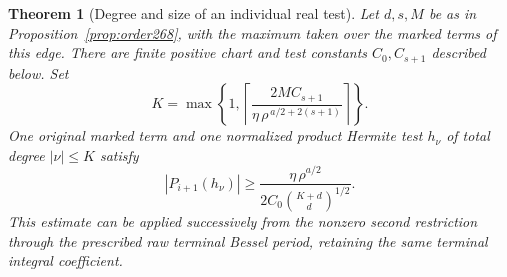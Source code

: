 \documentclass[a4paper,11pt]{article}
\newtheorem{theorem}[proposition]{Theorem}
\theoremstyle{definition}
\theoremstyle{remark}
\numberwithin{equation}{section}
\begin{document}
\begin{theorem}[Degree and size of an individual real test]\leavevmode
\label{thm:cutoff268}
Let \(d,s,M\) be as in Proposition~\ref{prop:order268}, with
the maximum taken over the marked terms of this edge. There
are finite positive chart and test constants \(C_0,C_{s+1}\)
described below. Set
\[
 K=\max\!\left\{1,\left\lceil
 \frac{2MC_{s+1}}{\eta\,\rho^{\,a/2+2(s+1)}}\right\rceil\right\}.
\]
One original marked term and one normalized product Hermite
test \(h_\nu\) of total degree \(|\nu|\le K\) satisfy
\[
       |P_{i+1}(h_\nu)|\ge
        \frac{\eta\,\rho^{a/2}}{2 C_0\binom{K+d}{d}^{1/2}} .
\]
This estimate can be applied successively from the nonzero
second restriction through the prescribed raw terminal Bessel
period, retaining the same terminal integral coefficient.
\end{theorem}
\end{document}
